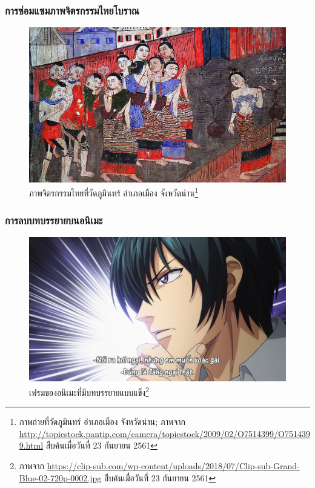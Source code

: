 \documentclass[xcolor=dvipsnames, xetex,serif]{beamer}
\numberwithin{equation}{section}
\begin{document}
    \begin{frame}
        \frametitle{การซ่อมแซมภาพจิตรกรรมไทยโบราณ}
         \begin{figure}[h]
            \includegraphics[width=0.6\linewidth]{images/thaiart.jpg}
            \caption{ภาพจิตรกรรมไทยที่วัดภูมินทร์ อำเภอเมือง จังหวัดน่าน\footnote{\tiny{ภาพถ่ายที่วัดภูมินทร์ อำเภอเมือง จังหวัดน่าน; ภาพจาก \url{http://topicstock.pantip.com/camera/topicstock/2009/02/O7514399/O7514399.html} สืบค้นเมื่อวันที่ 23 กันยายน 2561}}}
            \label{image:thaiart}
        \end{figure}
    \end{frame}
    \begin{frame}
        \frametitle{การลบบทบรรยายบนอนิเมะ}
         \begin{figure}[h]
            \includegraphics[width=0.6\linewidth]{images/animesub.jpg}
            \caption{เฟรมของอนิเมะที่มีบทบรรยายแบบแข็ง\footnote{\tiny{ภาพจาก \url{https://clip-sub.com/wp-content/uploads/2018/07/Clip-sub-Grand-Blue-02-720p-0002.jpg} สืบค้นเมื่อวันที่ 23 กันยายน 2561}}}
            \label{image:anime-sub}
        \end{figure}
    \end{frame}
\end{document}
